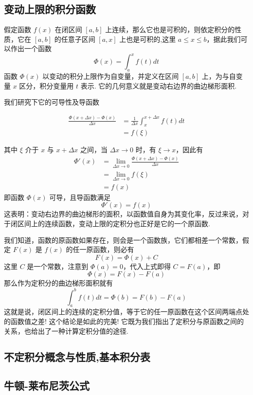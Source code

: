 \subsection{变动上限的积分函数}
\label{sec:variable-upper-limit-integral-function}

假定函数 $f(x)$ 在闭区间 $[a,b]$ 上连续，那么它也是可积的，则依定积分的性质，它在 $[a,b]$ 的任意子区间 $[a,x]$ 上也是可积的,这里 $a \leqslant x \leqslant b$，据此我们可以作出一个函数
\[ \Phi(x) = \int_a^x f(t) dt \]
函数 $\Phi(x)$ 以变动的积分上限作为自变量，并定义在区间 $[a,b]$ 上，为与自变量 $x$ 区分，积分变量用 $t$ 表示. 它的几何意义就是变动右边界的曲边梯形面积.

我们研究下它的可导性及导函数

\begin{equation*}
  \begin{split}
    \frac{\Phi(x+\Delta x)-\Phi(x)}{\Delta x} & = \frac{1}{\Delta x}\int_x^{x+\Delta x} f(t) dt \\
    & = f(\xi)
  \end{split}
\end{equation*}

其中 $\xi$ 介于 $x$ 与 $x+\Delta x$ 之间，当 $\Delta x \rightarrow 0$ 时，有 $\xi \rightarrow x$，因此有
\begin{equation*}
  \begin{split}
    \Phi'(x) & = \lim_{\Delta x \rightarrow 0}   \frac{\Phi(x+\Delta x)-\Phi(x)}{\Delta x} \\
    & = \lim_{\Delta x \rightarrow 0} f(\xi) \\
    & = f(x)
  \end{split}
\end{equation*}
即函数 $\Phi(x)$ 可导，且导函数满足
\[ \Phi'(x) = f(x) \]
这表明：变动右边界的曲边梯形的面积，以函数值自身为其变化率，反过来说，对于闭区间上的连续函数，变动上限的定积分也正好是它的一个原函数.

我们知道，函数的原函数如果存在，则会是一个函数族，它们都相差一个常数，假定 $F(x)$ 是 $f(x)$ 的任一原函数，则必有
\[ F(x) = \Phi(x) +C \]
这里 $C$ 是一个常数，注意到 $\Phi(a)=0$，代入上式即得 $C=F(a)$，即
\[ \Phi(x) = F(x) - F(a) \]
那么作为定积分的曲边梯形面积就有
\[ \int_a^{b}f(t)dt = \Phi(b) = F(b) - F(a) \]
这就是说，闭区间上的连续的定积分值，等于它的任一原函数在这个区间两端点处的函数值之差! 这个结论是如此的完美! 它既为我们指出了定积分与原函数之间的关系，也给出了一种计算定积分值的途径.


\subsection{不定积分概念与性质,基本积分表}
\label{sec:indefinite-integral}

\subsection{牛顿-莱布尼茨公式}
\label{sec:newton-leibniz-formular}













